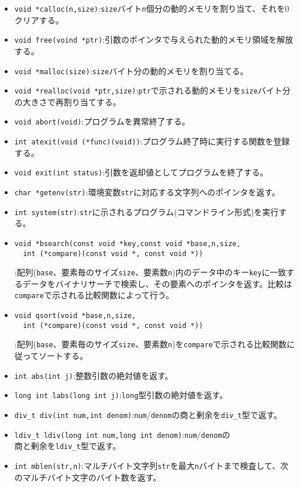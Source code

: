 \begin{itemize}
\item \verb|void *calloc(n,size)|:\verb|size|バイト\verb|n|個分の動的メモリを割り当て、それを0クリアする。
\item \verb|void free(voind *ptr)|:引数のポインタで与えられた動的メモリ領域を解放する。
\item \verb|void *malloc(size)|:\verb|size|バイト分の動的メモリを割り当てる。
\item \verb|void *realloc(void *ptr,size)|:\verb|ptr|で示される動的メモリを\verb|size|バイト分の大きさで再割り当てする。
\item \verb|void abort(void)|:プログラムを異常終了する。
\item \verb|int atexit(void (*func)(void))|:プログラム終了時に実行する関数を登録する。
\item \verb|void exit(int status)|:引数を返却値としてプログラムを終了する。
\item \verb|char *getenv(str)|:環境変数\verb|str|に対応する文字列へのポインタを返す。
\item \verb|int system(str)|:\verb|str|に示されるプログラム(コマンドライン形式)を実行する。
\item \begin{verbatim}
void *bsearch(const void *key,const void *base,n,size,
  int (*compare)(const void *, const void *))
\end{verbatim}:配列(\verb|base|、要素毎のサイズ\verb|size|、要素数\verb|n|)内のデータ中のキー\verb|key|に一致するデータをバイナリサーチで検索し、その要素へのポインタを返す。比較は\verb|compare|で示される比較関数によって行う。
\item \begin{verbatim}
void qsort(void *base,n,size,
  int (*compare)(const void *, const void *))
\end{verbatim}:配列(\verb|base|、要素毎のサイズ\verb|size|、要素数\verb|n|)を\verb|compare|で示される比較関数に従ってソートする。
\item \verb|int abs(int j)|:整数引数の絶対値を返す。
\item \verb|long int labs(long int j)|:\verb|long|型引数の絶対値を返す。
\item \verb|div_t div(int num,int denom)|:\verb|num|/\verb|denom|の商と剰余を\verb|div_t|型で返す。
\item \verb|ldiv_t ldiv(long int num,long int denom)|:\verb|num|/\verb|denom|の\\商と剰余を\verb|ldiv_t|型で返す。
\item \verb|int mblen(str,n)|:マルチバイト文字列\verb|str|を最大\verb|n|バイトまで検査して、次のマルチバイト文字のバイト数を返す。

\end{itemize}
